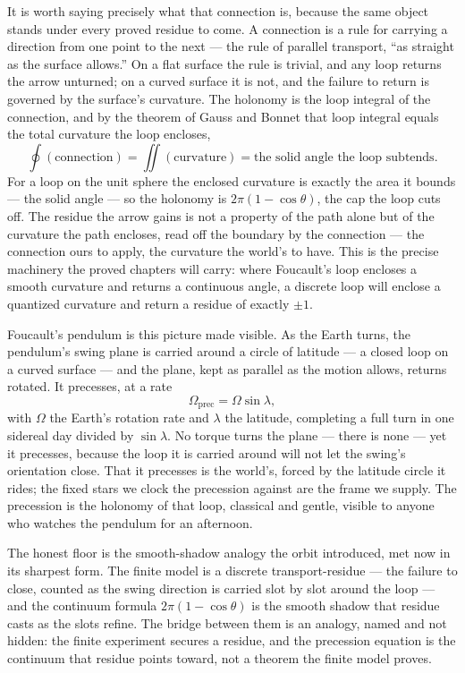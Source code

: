 It is worth saying precisely what that connection is, because the same object stands under every proved
residue to come. A connection is a rule for carrying a direction from one point to the next --- the rule of
parallel transport, ``as straight as the surface allows.'' On a flat surface the rule is trivial, and any loop
returns the arrow unturned; on a curved surface it is not, and the failure to return is governed by the
surface's curvature. The holonomy is the loop integral of the connection, and by the theorem of Gauss and
Bonnet that loop integral equals the total curvature the loop encloses,
\begin{equation}
  \oint (\text{connection}) = \iint (\text{curvature}) = \text{the solid angle the loop subtends}.
\end{equation}
For a loop on the unit sphere the enclosed curvature is exactly the area it bounds --- the solid angle --- so
the holonomy is $2\pi(1 - \cos\theta)$, the cap the loop cuts off. The residue the arrow gains is not a
property of the path alone but of the curvature the path encloses, read off the boundary by the connection ---
the connection ours to apply, the curvature the world's to have. This is the precise machinery the proved
chapters will carry: where Foucault's loop encloses a smooth curvature and returns a continuous angle, a
discrete loop will enclose a quantized curvature and return a residue of exactly $\pm 1$.

Foucault's pendulum is this picture made visible. As the Earth turns, the pendulum's swing plane is carried
around a circle of latitude --- a closed loop on a curved surface --- and the plane, kept as parallel as the
motion allows, returns rotated. It precesses, at a rate
\begin{equation}
  \Omega_{\mathrm{prec}} = \Omega \sin\lambda,
\end{equation}
with $\Omega$ the Earth's rotation rate and $\lambda$ the latitude, completing a full turn in one sidereal
day divided by $\sin\lambda$. No torque turns the plane --- there is none --- yet it precesses, because the
loop it is carried around will not let the swing's orientation close. That it precesses is the world's, forced
by the latitude circle it rides; the fixed stars we clock the precession against are the frame we supply. The
precession is the holonomy of that loop, classical and gentle, visible to anyone who watches the pendulum for
an afternoon.

The honest floor is the smooth-shadow analogy the orbit introduced, met now in its sharpest form. The finite
model is a discrete transport-residue --- the failure to close, counted as the swing direction is carried
slot by slot around the loop --- and the continuum formula $2\pi(1 - \cos\theta)$ is the smooth shadow that
residue casts as the slots refine. The bridge between them is an analogy, named and not hidden: the finite
experiment secures a residue, and the precession equation is the continuum that residue points toward, not a
theorem the finite model proves.

